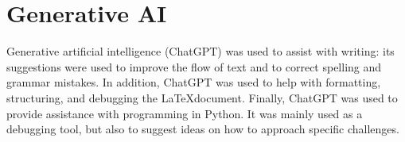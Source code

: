 \section{Generative AI}\label{generative AI}
Generative artificial intelligence (ChatGPT) was used to assist with writing: its suggestions were used to improve the flow of text and to correct spelling and grammar mistakes. In addition, ChatGPT was used to help with formatting, structuring, and debugging the \LaTeX document. Finally, ChatGPT was used to provide assistance with programming in Python. It was mainly used as a debugging tool, but also to suggest ideas on how to approach specific challenges.
 
